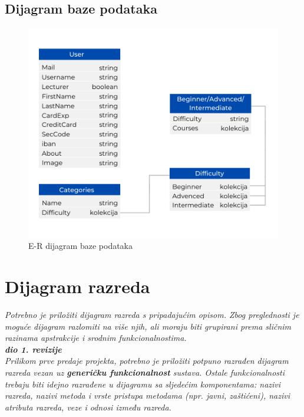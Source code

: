 			\subsection{Dijagram baze podataka}
				\begin{figure}[H]
					\includegraphics[scale=0.6]{dijagrami/ER_baza_podataka.PNG} 
					\centering
					\caption{E-R dijagram baze podataka}
					\label{fig:ER}
				\end{figure} 
			
			\eject
			
			
		\section{Dijagram razreda}
		
			\textit{Potrebno je priložiti dijagram razreda s pripadajućim opisom. Zbog preglednosti je moguće dijagram razlomiti na više njih, ali moraju biti grupirani prema sličnim razinama apstrakcije i srodnim funkcionalnostima.}\\
			
			\textbf{\textit{dio 1. revizije}}\\
			
			\textit{Prilikom prve predaje projekta, potrebno je priložiti potpuno razrađen dijagram razreda vezan uz \textbf{generičku funkcionalnost} sustava. Ostale funkcionalnosti trebaju biti idejno razrađene u dijagramu sa sljedećim komponentama: nazivi razreda, nazivi metoda i vrste pristupa metodama (npr. javni, zaštićeni), nazivi atributa razreda, veze i odnosi između razreda.}\\
			
